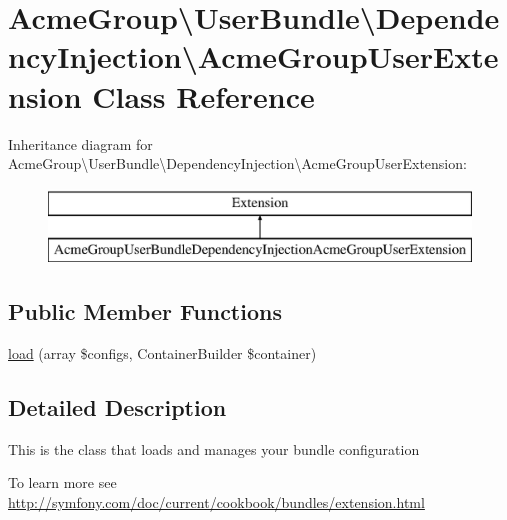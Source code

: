 \hypertarget{class_acme_group_1_1_user_bundle_1_1_dependency_injection_1_1_acme_group_user_extension}{\section{Acme\+Group\textbackslash{}User\+Bundle\textbackslash{}Dependency\+Injection\textbackslash{}Acme\+Group\+User\+Extension Class Reference}
\label{class_acme_group_1_1_user_bundle_1_1_dependency_injection_1_1_acme_group_user_extension}
}
Inheritance diagram for Acme\+Group\textbackslash{}User\+Bundle\textbackslash{}Dependency\+Injection\textbackslash{}Acme\+Group\+User\+Extension\+:\begin{figure}[H]
\begin{center}
\leavevmode
\includegraphics[height=2.000000cm]{class_acme_group_1_1_user_bundle_1_1_dependency_injection_1_1_acme_group_user_extension}
\end{center}
\end{figure}
\subsection*{Public Member Functions}
\begin{DoxyCompactItemize}
\item 
\hyperlink{class_acme_group_1_1_user_bundle_1_1_dependency_injection_1_1_acme_group_user_extension_a916296398d2a3eca09d86e5158a7cde4}{load} (array \$configs, Container\+Builder \$container)
\end{DoxyCompactItemize}


\subsection{Detailed Description}
This is the class that loads and manages your bundle configuration

To learn more see \hyperlink{}{http\+://symfony.\+com/doc/current/cookbook/bundles/extension.\+html} 

